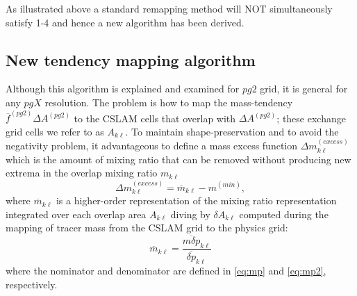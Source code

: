 






As illustrated above a standard remapping method will NOT simultaneously satisfy 1-4 and hence a new algorithm has been derived.
\subsection{New tendency mapping algorithm}
Although this algorithm is explained and examined for $pg2$ grid, it is general for any $pgX$ resolution. The problem is how to map the mass-tendency ${\overline{f}}^{(pg2)}\Delta A^{(pg2)}$ to the CSLAM cells that overlap with $\Delta A^{(pg2)}$; these exchange grid cells we refer to as $A_{k\ell}$. To maintain shape-preservation and to avoid the negativity problem, it advantageous to define a mass excess function $\Delta m_{k\ell}^{(excess)}$ which is the amount of mixing ratio that can be removed without producing new extrema in the overlap mixing ratio $m_{k\ell}$
\begin{equation}
\Delta m^{(excess)}_{k\ell}=\overline{m}_{k\ell}-m^{(min)},
\end{equation}
where $\overline{m}_{k\ell}$ is a higher-order representation of the mixing ratio representation integrated over each overlap area $A_{k\ell}$ diving by $\delta A_{k\ell}$ computed during the mapping of tracer mass from the CSLAM grid to the physics grid:
\begin{equation}
\label{eq:moverlap}
\overline{m}_{k\ell}=\frac{\overline{m\delta p}_{k\ell}}{\overline{\delta p}_{k\ell}}
\end{equation}
where the nominator and denominator are defined in \eqref{eq:mp} and \eqref{eq:mp2}, respectively. 

